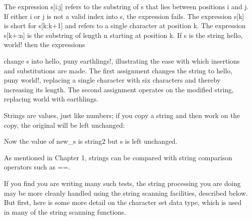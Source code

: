 \bigskip

The expression \textsf{s[i:j]} refers to the
substring of \textsf{s} that lies between positions
\textsf{i} and \textsf{j}. If either \textsf{i} or j is not a valid
index into \textsf{s}, the expression fails. The expression
\textsf{s[k]} is short for \textsf{s[k:k+1]} and refers to a single
character at position \textsf{k}. The expression
\textsf{s[k+:n]} is the substring of length \textsf{n} starting at
position \textsf{k}. If \textsf{s} is the string
\textsf{{\textquotedbl}hello, world!{\textquotedbl}} then the
expressions


\noindent
change \textsf{s} into \textsf{{\textquotedbl}hello, puny
earthlings!{\textquotedbl}}, illustrating the ease with which
insertions and substitutions are made. The first assignment changes the
string to \textsf{{\textquotedbl}hello, puny world!{\textquotedbl}},
replacing a single character with six characters and thereby increasing
its length. The second assignment operates on the modified string,
replacing \textsf{{\textquotedbl}world{\textquotedbl}} with
\textsf{{\textquotedbl}earthlings{\textquotedbl}}.

Strings are values, just like numbers; if you copy a string and then
work on the copy, the original will be left unchanged:


Now the value of \textsf{new\_s} is
{\textquotedbl}string2{\textquotedbl} but \textsf{s} is left unchanged.

As mentioned in Chapter 1, strings can be compared with string
comparison operators such as
\textsf{==}.


If you find you are writing many such tests, the string processing you
are doing may be more cleanly handled using the string scanning
facilities, described below. But first, here is some more detail on the
character set data type, which is used in many of the string scanning
functions.

